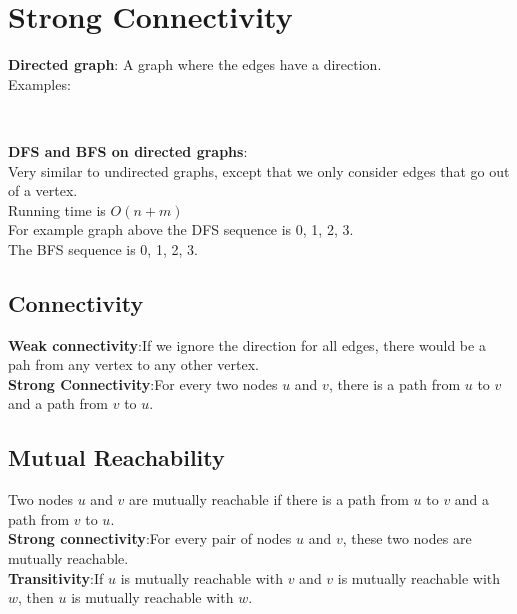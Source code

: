 \documentclass[onecolumn]{report}
\begin{document}
\section{Strong Connectivity}
\textbf{Directed graph}: A graph where the edges have a direction.\\
Examples:\\
\begin{center}
    \\
\end{center}
\noindent
\textbf{DFS and BFS on directed graphs}:\\
Very similar to undirected graphs, except that we only consider edges that go out of a vertex.\\
Running time is $O(n+m)$\\
For example graph above the DFS sequence is 0, 1, 2, 3.\\
The BFS sequence is 0, 1, 2, 3.\\
\subsection{Connectivity}
\textbf{Weak connectivity}:If we ignore the direction for all edges, there would be a pah from any vertex to any other vertex.\\
\textbf{Strong Connectivity}:For every two nodes $u$ and $v$, there is a path from $u$ to $v$ and a path from $v$ to $u$.\\

\subsection{Mutual Reachability}
Two nodes $u$ and $v$ are mutually reachable if there is a path from $u$ to $v$ and a path from $v$ to $u$.\\
\textbf{Strong connectivity}:For every pair of nodes $u$ and $v$, these two nodes are mutually reachable.\\
\textbf{Transitivity}:If $u$ is mutually reachable with $v$ and $v$ is mutually reachable with $w$, then $u$ is mutually reachable with $w$.\\
\\
\end{document}
